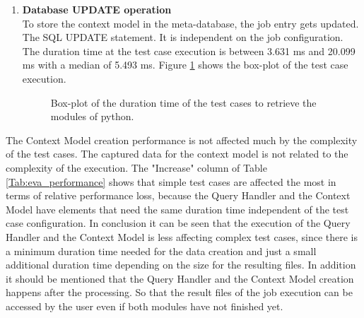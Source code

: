 \documentclass[draft,final]{vutinfth} %
\begin{document}
\begin{enumerate}
	\item \textbf{Database UPDATE operation} \\
	To store the context model in the meta-database, the job entry gets updated. The SQL UPDATE statement. It is independent on the job configuration. The duration time at the test case execution is between 3.631 ms and 20.099 ms with a median of 5.493 ms. Figure \ref{fig:evaluation_perf_database} shows the box-plot of the test case execution. 

\begin{figure}[!h]
	\centering
	\caption{Box-plot of the duration time of the test cases to retrieve the modules of python.}
	\label{fig:evaluation_perf_database}		
\end{figure}

\end{enumerate}

 The Context Model creation performance is not affected much by the complexity of the test cases. The captured data for the context model is not related to the complexity of the execution. The "Increase" column of Table \ref{Tab:eva_performance} shows that simple test cases are affected the most in terms of relative performance loss, because the Query Handler and the Context Model have elements that need the same duration time independent of the test case configuration. In conclusion it can be seen that the execution of the Query Handler and the Context Model is less affecting complex test cases, since there is a minimum duration time needed for the data creation and just a small additional duration time depending on the size for the resulting files. In addition it should be mentioned that the Query Handler and the Context Model creation happens after the processing. So that the result files of the job execution can be accessed by the user even if both modules have not finished yet.
   
\end{document}
